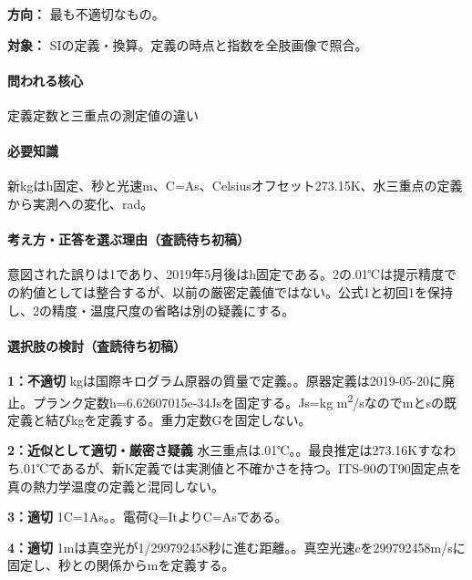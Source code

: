 \noindent\textbf{方向：} 最も不適切なもの。\par

\noindent\textbf{対象：} SIの定義・換算。定義の時点と指数を全肢画像で照合。\par

\paragraph{問われる核心} 定義定数と三重点の測定値の違い

\paragraph{必要知識} 新kgはh固定、秒と光速m、C=\allowbreak{}As、Celsiusオフセット273.15K、水三重点の定義から実測への変化、rad。

\paragraph{考え方・正答を選ぶ理由（査読待ち初稿）} 意図された誤りは1であり、2019年5月後はh固定である。2の.01℃は提示精度での約値としては整合するが、以前の厳密定義値ではない。公式1と初回1を保持し、2の精度・温度尺度の省略は別の疑義にする。

\paragraph{選択肢の検討（査読待ち初稿）}\mbox{}\par

\noindent\textbf{1：不適切} kgは国際キログラム原器の質量で定義。。原器定義は2019-05-20に廃止。プランク定数h=\allowbreak{}6.62607015e-34Jsを固定する。Js=\allowbreak{}kg m\textsuperscript{2}/sなのでmとsの既定義と結びkgを定義する。重力定数Gを固定しない。\par

\noindent\textbf{2：近似として適切・厳密さ疑義} 水三重点は.01℃。。最良推定は273.16Kすなわち.01℃であるが、新K定義では実測値と不確かさを持つ。ITS-90のT90固定点を真の熱力学温度の定義と混同しない。\par

\noindent\textbf{3：適切} 1C=\allowbreak{}1As。。電荷Q=\allowbreak{}ItよりC=\allowbreak{}Asである。\par

\noindent\textbf{4：適切} 1mは真空光が1/299792458秒に進む距離。。真空光速cを299792458m/sに固定し、秒との関係からmを定義する。\par


